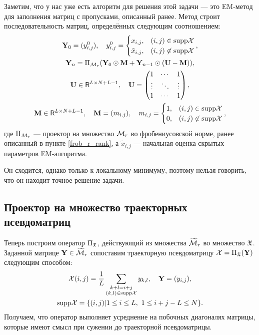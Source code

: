 \documentclass[12pt,a4paper,fleqn,leqno]{article}
\begin{document}
Заметим, что у нас уже есть алгоритм для решения этой задачи --- это EM-метод для заполнения матриц с пропусками, описанный ранее. Метод строит последовательность матриц, определённых следующим соотношением:
\begin{gather*}
\mathbf{Y}_0 = (y^0_{i,j}), \quad y^0_{i,j} = \begin{cases}
x_{i, j}, & (i, j) \in \text{supp} \mathcal{X} \\
\tilde x_{i, j}, & (i, j) \not \in \text{supp} \mathcal{X}
\end{cases},\\ \mathbf{Y}_n = \Pi_{\mathcal{M}_r}(\mathbf{Y}_0 \odot \mathbf{M} + \mathbf{Y}_{n - 1} \odot (\mathbf{U} -  \mathbf{M})), \\
\mathbf{U} \in \mathsf{R}^{L \times N + L -1}, \quad \mathbf{U} = \begin{pmatrix}
1 & \cdots & 1 \\
\vdots & \ddots & \vdots \\
1 & \cdots & 1
\end{pmatrix} , \\
\mathbf{M} \in \mathsf{R}^{L \times N + L - 1}, \quad \mathbf{M} = (m_{i,j}), \quad
m_{i,j} = \begin{cases}
1, & (i, j) \in \text{supp} \mathcal{X} \\
0, & (i, j) \not \in \text{supp} \mathcal{X}
\end{cases},
\end{gather*}
где $\Pi_{\mathcal{M}_r}$ --- проектор на множество $\mathcal{M}_r$ во фробениусовской норме, ранее описанный в пункте \ref{frob_r_rank}, а $\tilde x_{i,j}$ --- начальная оценка скрытых параметров EM-алгоритма.

Он сходится, однако только к локальному минимуму, поэтому нельзя говорить, что он находит точное решение задачи.

\subsection{Проектор на множество траекторных псевдоматриц}
Теперь построим оператор $\Pi_{\mathfrak{X}}$, действующий из множества $\widetilde{\mathcal{M}}_r$ во множество $\mathfrak{X}$. Заданной матрице $\mathbf{Y} \in \widetilde{\mathcal{M}}_r$ сопоставим траекторную псевдоматрицу $\mathcal{X} = \Pi_{\mathfrak{X}}(\mathbf{Y})$ следующим способом:
\begin{gather*}
\mathcal{X}(i, j) = \frac{1}{L} \sum_{\substack{k + l = i + j \\ (k, l) \in \text{supp} \mathcal{X}}} y_{k,l}, \quad \mathbf{Y} = (y_{i, j}), \\ \text{supp} \mathcal{X} = \{(i,j) | 1 \le i \le L,\ 1 \le i+j-L \le N\}.
\end{gather*}
Получаем, что оператор выполняет усреднение на побочных диагоналях матрицы, которые имеют смысл при сужении до траекторной псевдоматрицы.
\end{document}
